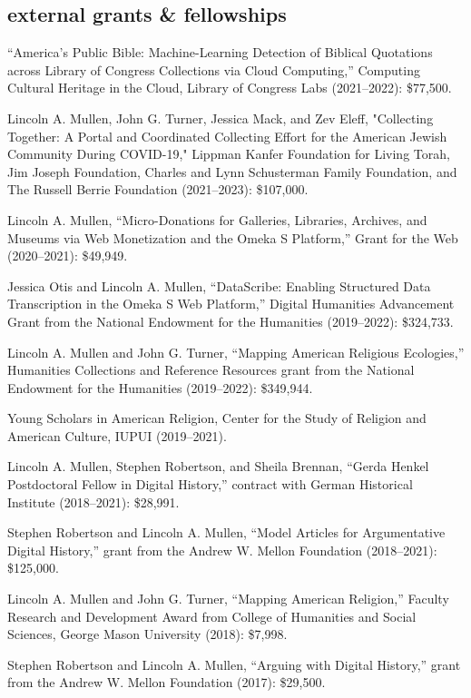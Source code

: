 \documentclass[11pt]{article}
\begin{document}
\subsection{external grants \& fellowships}\label{grants-and-fellowships}

``America's Public Bible: Machine-Learning Detection of Biblical Quotations across Library of Congress Collections via Cloud Computing,'' Computing Cultural Heritage in the Cloud, Library of Congress Labs (2021--2022): \$77,500.

Lincoln A. Mullen, John G. Turner, Jessica Mack, and Zev Eleff, "Collecting Together: A Portal and Coordinated Collecting Effort for the American Jewish Community During COVID-19," Lippman Kanfer Foundation for Living Torah, Jim Joseph Foundation, Charles and Lynn Schusterman Family Foundation, and The Russell Berrie Foundation (2021--2023): \$107,000.

Lincoln A. Mullen, ``Micro-Donations for Galleries, Libraries, Archives, and Museums via Web Monetization and the Omeka S Platform,'' Grant for the Web (2020--2021): \$49,949.

Jessica Otis and Lincoln A. Mullen, ``DataScribe: Enabling Structured Data Transcription in the Omeka S Web
Platform,'' Digital Humanities Advancement Grant from the National Endowment for the Humanities (2019--2022): \$324,733.

Lincoln A. Mullen and John G. Turner, ``Mapping American Religious Ecologies,'' Humanities Collections and Reference Resources grant from the National Endowment for the Humanities (2019--2022): \$349,944.

Young Scholars in American Religion, Center for the Study of Religion and American Culture, IUPUI (2019--2021).

Lincoln A. Mullen, Stephen Robertson, and Sheila Brennan, ``Gerda Henkel Postdoctoral Fellow in Digital History,'' contract with German Historical Institute (2018--2021): \$28,991.

Stephen Robertson and Lincoln A. Mullen, ``Model Articles for Argumentative Digital History,'' grant from the Andrew W. Mellon Foundation (2018--2021): \$125,000.

Lincoln A. Mullen and John G. Turner, ``Mapping American Religion,'' Faculty Research and Development Award from College of Humanities and Social Sciences, George Mason University (2018): \$7,998.

Stephen Robertson and Lincoln A. Mullen, ``Arguing with Digital History,'' grant from the Andrew W. Mellon Foundation (2017): \$29,500.
\end{document}

